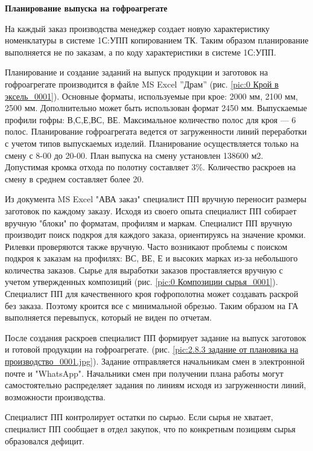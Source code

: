 \textbf{Планирование выпуска на гофроагрегате}

На каждый заказ производства менеджер создает новую характеристику номенклатуры в системе 1С:УПП копированием ТК. Таким образом планирование выполняется не по заказам, а по коду характеристики в системе 1С:УПП.


Планирование и создание заданий  на выпуск продукции и заготовок на гофроагрегате производится в файле MS Excel ''Драм'' (рис. \ref{pic:0 Крой в эксель_0001}). Основные форматы, используемые при крое: 2000 мм, 2100 мм, 2500 мм. Дополнительно может быть использован формат 2450 мм. Выпускаемые профили гофры: В,С,Е,ВС, ВЕ. Максимальное количество полос для кроя --- 6 полос. Планирование гофроагрегата ведется от загруженности линий переработки с учетом типов выпускаемых изделий. Планирование осуществляется только на смену с 8-00 до 20-00. План выпуска на смену установлен 138600 м2. Допустимая кромка отхода по полотну составляет 3\%. Количество раскроев на смену в среднем составляет более 20.

Из документа MS Excel "АВА заказ" специалист ПП вручную переносит размеры заготовок по каждому заказу. Исходя из своего опыта специалист ПП собирает вручную "блоки" по форматам, профилям и маркам.  Специалист ПП вручную производит поиск подкроя для каждого заказа, ориентируясь на значение кромки. Рилевки проверяются также вручную. Часто возникают проблемы с поиском подкроя к заказам на профилях: ВС, ВЕ, Е и высоких марках из-за небольшого количества заказов. Сырье для выработки заказов проставляется вручную с учетом утвержденных композиций (рис. \ref{pic:0 Композиции сырья_0001}).
Специалист ПП для качественного кроя гофрополотна может создавать раскрой без заказа. Поэтому кроится все с минимальной обрезью. 
Таким образом на ГА выполняется перевыпуск, который не виден по отчетам.

После создания раскроев специалист ПП формирует задание на выпуск заготовок и готовой продукции на гофроагрегате. (рис. \ref{pic:2.8.3 задание от плановика на производство_0001.jpg}). Задание отправляется начальникам смен в электронной почте и "WhatsApp". 
Начальники смен  при получении плана работы могут самостоятельно распределяет задания по линиям исходя из загруженности линий, возможности производства. 

Специалист ПП контролирует остатки по сырью. Если сырья не хватает, специалист ПП сообщает в отдел закупок, что по конкретным позициям сырья образовался дефицит.


\clearpage

